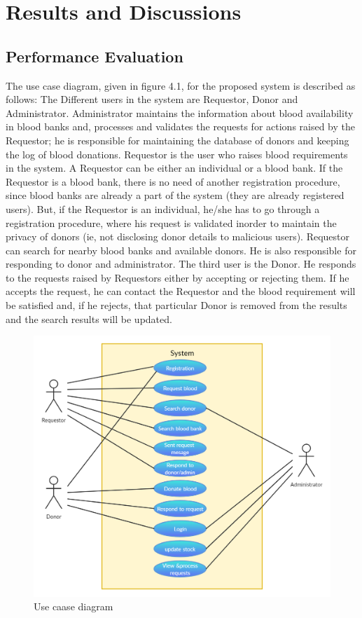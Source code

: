 \chapter{Results and Discussions}
\setcounter{equation}{0}
\section{Performance Evaluation}
The use case diagram, given in figure 4.1, for the proposed system is described as follows: The Different users in the system are Requestor, Donor and Administrator. Administrator maintains the information about blood availability in blood banks and, processes and validates the requests for actions raised by the Requestor; he is responsible for maintaining the database of donors and keeping the log of blood donations. Requestor is the user who raises blood requirements in the system. A Requestor can be either an individual or a blood bank. If the Requestor is a blood bank, there is no need of another registration procedure, since blood banks are already a part of the system (they are already registered users). But, if the Requestor is an individual, he/she has to go through a registration procedure, where his request is validated inorder to maintain the privacy of donors (ie, not disclosing donor details to malicious users). Requestor can search for nearby blood banks and available donors. He is also responsible for responding to donor and administrator. The third user is the Donor. He responds to the requests raised by Requestors either by accepting or rejecting them. If he accepts the request, he can contact the Requestor and the blood requirement will be satisfied and, if he rejects, that particular Donor is removed from the results and the search results will be updated.

\begin{figure}
    \centering
    \includegraphics[width=\textwidth]{UseCase.jpg}
    \caption{Use caase diagram}

\end{figure}

